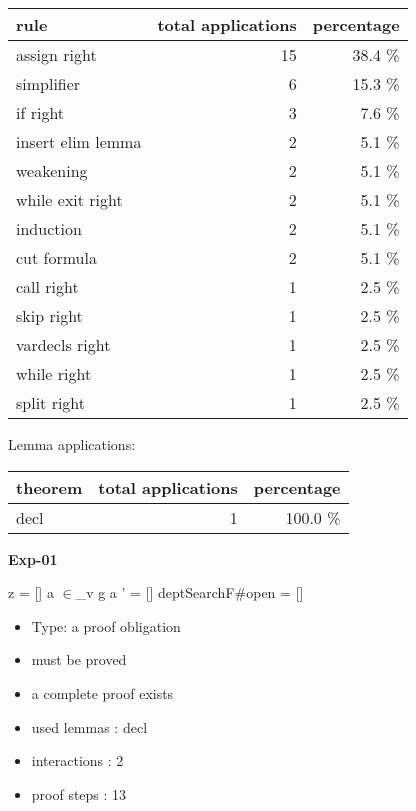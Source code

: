 \documentclass[a4paper]{article}
\begin{document}
\begin{supertabular}{l|r|r}
rule	        & total applications & percentage \\ \hline
assign right & 15 & 38.4 \% \\
simplifier & 6 & 15.3 \% \\
if right & 3 & 7.6 \% \\
insert elim lemma & 2 & 5.1 \% \\
weakening & 2 & 5.1 \% \\
while exit right & 2 & 5.1 \% \\
induction & 2 & 5.1 \% \\
cut formula & 2 & 5.1 \% \\
call right & 1 & 2.5 \% \\
skip right & 1 & 2.5 \% \\
vardecls right & 1 & 2.5 \% \\
while right & 1 & 2.5 \% \\
split right & 1 & 2.5 \% \\

\end{supertabular}

Lemma applications:

\begin{supertabular}{l|r|r}
theorem	        & total applications & percentage \\ \hline
decl & 1 & 100.0 \% \\

\end{supertabular}
\pagebreak

{\LARGE\bf Exp-01}\label{lemma-Exp-01}

\medskip

 \Fol z = [] \And a $\in$\_v g \Or a ' = [] \Imp \Do deptSearchF\#\Dc open = []

\begin{itemize}

\item Type: a proof obligation

\item       must be proved
\item       a complete proof exists
\item       used lemmas  : decl
\item       interactions : 2
\item       proof steps  : 13
\end{itemize}

\medskip
\end{document}
